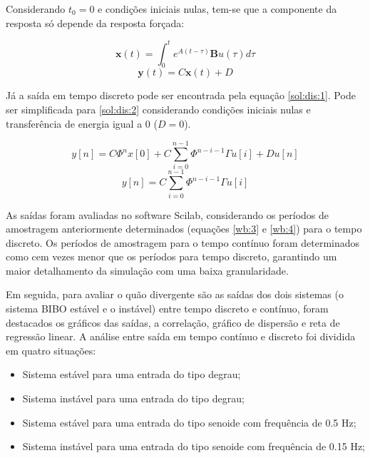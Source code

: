 Considerando $t_0=0$ e condições iniciais nulas, tem-se que a componente da resposta só depende da resposta forçada:

\begin{equation} \label{sol:cont:2}
    \textbf{x}(t)= \int_{0}^{t} e^{A(t-\tau)}\textbf{B}u(\tau) d\tau 
\end{equation}
\begin{equation} \label{sol:cont:3}
    \textbf{y}(t)= C\textbf{x}(t) + D
\end{equation}


Já a saída em tempo discreto pode ser encontrada pela equação \ref{sol:dis:1}. Pode ser simplificada para \ref{sol:dis:2} considerando condições iniciais nulas e transferência de energia igual a 0 ($D=0$).

\begin{equation} \label{sol:dis:1}
    y[n] = C\Phi^{n} x[0] + C \sum_{i=0}^{n-1} \Phi^{n-i-1}\Gamma u[i] + D u[n]
\end{equation}
\begin{equation} \label{sol:dis:2}
    y[n] =  C \sum_{i=0}^{n-1} \Phi^{n-i-1}\Gamma u[i] 
\end{equation}

As saídas foram avaliadas no software Scilab, considerando os períodos de amostragem anteriormente determinados (equações \ref{wb:3} e \ref{wb:4}) para o tempo discreto. Os períodos de amostragem para o tempo contínuo foram determinados como cem vezes menor que os períodos para tempo discreto, garantindo um maior detalhamento da simulação com uma baixa granularidade.

Em seguida, para avaliar o quão divergente são as saídas dos dois sistemas (o sistema BIBO estável e o instável) entre tempo discreto e contínuo, foram destacados os gráficos das saídas, a correlação, gráfico de dispersão e reta de regressão linear. A análise entre saída em tempo contínuo e discreto foi dividida em quatro situações:

\begin{itemize}
    \item Sistema estável para uma entrada do tipo degrau;
    \item Sistema instável para uma entrada do tipo degrau;
    \item Sistema estável para uma entrada do tipo senoide com frequência de 0.5 Hz;
    \item Sistema instável para uma entrada do tipo senoide com frequência de 0.15 Hz;
\end{itemize}

